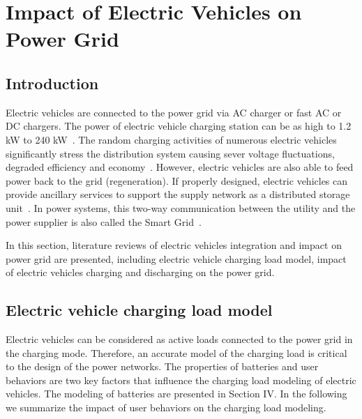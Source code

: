\section{Impact of Electric Vehicles on Power Grid} \label{sec:power_grid}

\subsection{Introduction}

Electric vehicles are connected to the power grid via AC charger or fast AC or DC chargers. 
The power of electric vehicle charging station can be as high to 1.2 kW to 240 kW~\cite{YC_Hadley}.
The random charging activities of numerous electric vehicles significantly stress the distribution system causing sever voltage fluctuations, degraded efficiency and economy~\cite{YC_Putrus,YC_Clement}. 
However, electric vehicles are also able to feed power back to the grid (regeneration). 
If properly designed, electric vehicles can provide ancillary services to support the supply network as a distributed storage unit~\cite{YC_smartgrid1,YC_smartgrid2}. 
In power systems, this two-way communication between the utility and the power supplier is also called the Smart Grid~\cite{YC_smartgrid}.

In this section, literature reviews of electric vehicles integration and impact on power grid are presented, including electric vehicle charging load model, impact of electric vehicles charging and discharging on the power grid.

\subsection{Electric vehicle charging load model}

Electric vehicles can be considered as active loads connected to the power grid in the charging mode. 
Therefore, an accurate model of the charging load is critical to the design of the power networks. 
The properties of batteries and user behaviors are two key factors that influence the charging load modeling of electric vehicles. The modeling of batteries are presented in Section IV. 
In the following we summarize the impact of user behaviors on the charging load modeling. 

